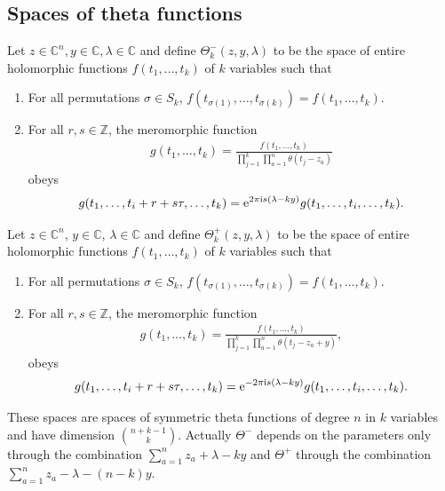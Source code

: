 \documentclass[10pt,a4paper]{amsart}
\numberwithin{equation}{section}
\begin{document}
\subsection{Spaces of theta functions}\label{ss-3.1}
\begin{Definition}\label{def-theta-} Let $z\in\mathbb C^n,y\in\mathbb C,\lambda\in\mathbb C$ and define $\Theta^-_k(z,y,\lambda)$ to be the space of entire holomorphic functions $f(t_1,\dots,t_k)$ of $k$ variables such that
 \begin{enumerate}\itemsep=0pt
 \item For all permutations $\sigma\in S_k$, $f(t_{\sigma(1)},\dots,t_{\sigma(k)})=f(t_1,\dots,t_k)$.
 \item For all $r,s\in\mathbb Z$, the meromorphic function
 \begin{gather*}
 g(t_1,\dots,t_k)=\frac{f(t_1,\dots,t_k)}{\prod\limits_{j=1}^k\prod\limits_{a=1}^n \theta(t_j-z_a)}
 \end{gather*}
 obeys
 \begin{gather*}
 g(t_1,\dots, t_i+r+s\tau,\dots,t_k)={\rm e}^{2\pi {\rm i}s(\lambda-ky)}g(t_1,\dots,t_i,\dots,t_k).
 \end{gather*}
 \end{enumerate}
\end{Definition}
\begin{Definition}\label{def-theta+} Let $z\in\mathbb C^n$, $y\in\mathbb C$, $\lambda\in\mathbb C$ and define $\Theta^+_k(z,y,\lambda)$ to be the space of entire holomorphic functions $f(t_1,\dots,t_k)$ of $k$ variables such that
 \begin{enumerate}\itemsep=0pt
 \item For all permutations $\sigma\in S_k$, $f(t_{\sigma(1)},\dots,t_{\sigma(k)})=f(t_1,\dots,t_k)$.
 \item For all $r,s\in\mathbb Z$, the meromorphic function
 \begin{gather*}
 g(t_1,\dots,t_k)=\frac{f(t_1,\dots,t_k)}{\prod\limits_{j=1}^k\prod\limits_{a=1}^n \theta(t_j-z_a+y)},
 \end{gather*}
 obeys
 \begin{gather*}
 g(t_1,\dots, t_i+r+s\tau,\dots,t_k)={\rm e}^{-2\pi{\rm i}s(\lambda-ky)}g(t_1,\dots,t_i,\dots,t_k).
 \end{gather*}
 \end{enumerate}
\end{Definition}
\begin{Remark}\label{remark-1} These spaces are spaces of symmetric theta functions of degree $n$ in $k$ variables and have dimension ${n+k-1 \choose k}$. Actually $\Theta^-$ depends on the parameters only through the combination $\sum\limits_{a=1}^n z_a+\lambda-ky$ and $\Theta^+$ through the combination $\sum\limits_{a=1}^nz_a-\lambda-(n-k)y$.
\end{Remark}
\end{document}
